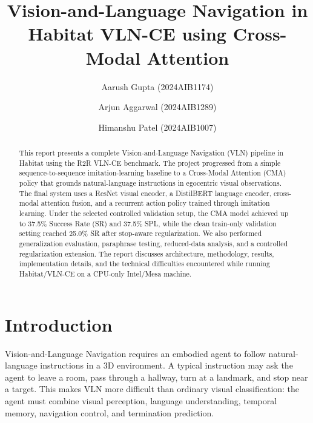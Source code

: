 \graphicspath{
  {../VLN-CE/task45_results/graphs/}
  {../VLN-CE/task5_regularization_results/graphs/}
  {./}
}

\title{Vision-and-Language Navigation in Habitat VLN-CE using Cross-Modal Attention}

\author{Aarush Gupta (2024AIB1174)}
\email{}

\author{Arjun Aggarwal (2024AIB1289)}
\email{}

\author{Himanshu Patel (2024AIB1007)}
\email{}



\begin{abstract}
This report presents a complete Vision-and-Language Navigation (VLN) pipeline in Habitat using the R2R VLN-CE benchmark. The project progressed from a simple sequence-to-sequence imitation-learning baseline to a Cross-Modal Attention (CMA) policy that grounds natural-language instructions in egocentric visual observations. The final system uses a ResNet visual encoder, a DistilBERT language encoder, cross-modal attention fusion, and a recurrent action policy trained through imitation learning. Under the selected controlled validation setup, the CMA model achieved up to 37.5\% Success Rate (SR) and 37.5\% SPL, while the clean train-only validation setting reached 25.0\% SR after stop-aware regularization. We also performed generalization evaluation, paraphrase testing, reduced-data analysis, and a controlled regularization extension. The report discusses architecture, methodology, results, implementation details, and the technical difficulties encountered while running Habitat/VLN-CE on a CPU-only Intel/Mesa machine.
\end{abstract}

\maketitle

\section{Introduction}

Vision-and-Language Navigation requires an embodied agent to follow natural-language instructions in a 3D environment. A typical instruction may ask the agent to leave a room, pass through a hallway, turn at a landmark, and stop near a target. This makes VLN more difficult than ordinary visual classification: the agent must combine visual perception, language understanding, temporal memory, navigation control, and termination prediction.

